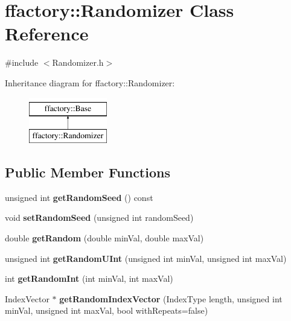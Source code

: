 \hypertarget{classffactory_1_1_randomizer}{\section{ffactory\-:\-:Randomizer Class Reference}
\label{classffactory_1_1_randomizer}
}


{\ttfamily \#include $<$Randomizer.\-h$>$}

Inheritance diagram for ffactory\-:\-:Randomizer\-:\begin{figure}[H]
\begin{center}
\leavevmode
\includegraphics[height=2.000000cm]{classffactory_1_1_randomizer}
\end{center}
\end{figure}
\subsection*{Public Member Functions}
\begin{DoxyCompactItemize}
\item 
\hypertarget{classffactory_1_1_randomizer_a084421f5bdd8bdf7272dde0f78464095}{unsigned int {\bfseries get\-Random\-Seed} () const }\label{classffactory_1_1_randomizer_a084421f5bdd8bdf7272dde0f78464095}

\item 
\hypertarget{classffactory_1_1_randomizer_a54e3fbc6a9c0ff3351ffc2a2020000e7}{void {\bfseries set\-Random\-Seed} (unsigned int random\-Seed)}\label{classffactory_1_1_randomizer_a54e3fbc6a9c0ff3351ffc2a2020000e7}

\item 
\hypertarget{classffactory_1_1_randomizer_a351a7703db659918b0d033e13c88e8c7}{double {\bfseries get\-Random} (double min\-Val, double max\-Val)}\label{classffactory_1_1_randomizer_a351a7703db659918b0d033e13c88e8c7}

\item 
\hypertarget{classffactory_1_1_randomizer_ad5a911f73c32b0b8e00d9b748f127513}{unsigned int {\bfseries get\-Random\-U\-Int} (unsigned int min\-Val, unsigned int max\-Val)}\label{classffactory_1_1_randomizer_ad5a911f73c32b0b8e00d9b748f127513}

\item 
\hypertarget{classffactory_1_1_randomizer_a22621b39371b725ba803c96a763e3cef}{int {\bfseries get\-Random\-Int} (int min\-Val, int max\-Val)}\label{classffactory_1_1_randomizer_a22621b39371b725ba803c96a763e3cef}

\item 
\hypertarget{classffactory_1_1_randomizer_a2b584af62d3aea1dc353f37b0e6c39fb}{Index\-Vector $\ast$ {\bfseries get\-Random\-Index\-Vector} (Index\-Type length, unsigned int min\-Val, unsigned int max\-Val, bool with\-Repeats=false)}\label{classffactory_1_1_randomizer_a2b584af62d3aea1dc353f37b0e6c39fb}

\end{DoxyCompactItemize}


